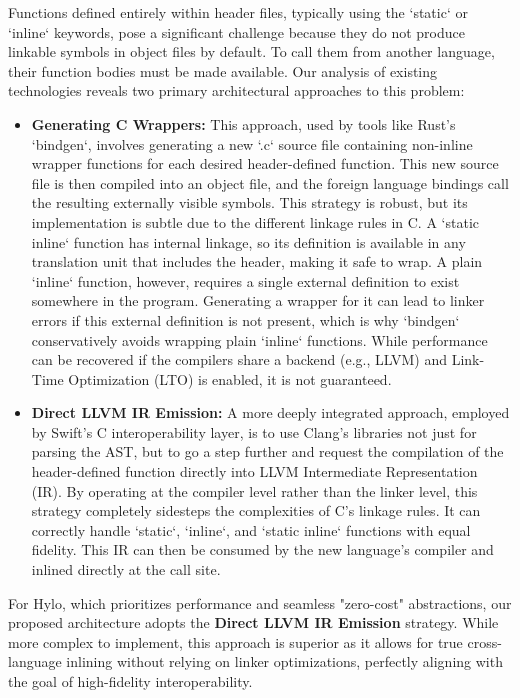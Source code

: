 Functions defined entirely within header files, typically using the `static` or `inline` keywords, pose a significant challenge because they do not produce linkable symbols in object files by default. To call them from another language, their function bodies must be made available. Our analysis of existing technologies reveals two primary architectural approaches to this problem:
\begin{itemize}
    \item \textbf{Generating C Wrappers:} This approach, used by tools like Rust's `bindgen`, involves generating a new `.c` source file containing non-inline wrapper functions for each desired header-defined function. This new source file is then compiled into an object file, and the foreign language bindings call the resulting externally visible symbols. This strategy is robust, but its implementation is subtle due to the different linkage rules in C. A `static inline` function has internal linkage, so its definition is available in any translation unit that includes the header, making it safe to wrap. A plain `inline` function, however, requires a single external definition to exist somewhere in the program. Generating a wrapper for it can lead to linker errors if this external definition is not present, which is why `bindgen` conservatively avoids wrapping plain `inline` functions. While performance can be recovered if the compilers share a backend (e.g., LLVM) and Link-Time Optimization (LTO) is enabled, it is not guaranteed.
    \item \textbf{Direct LLVM IR Emission:} A more deeply integrated approach, employed by Swift's C interoperability layer, is to use Clang's libraries not just for parsing the AST, but to go a step further and request the compilation of the header-defined function directly into LLVM Intermediate Representation (IR). By operating at the compiler level rather than the linker level, this strategy completely sidesteps the complexities of C's linkage rules. It can correctly handle `static`, `inline`, and `static inline` functions with equal fidelity. This IR can then be consumed by the new language's compiler and inlined directly at the call site.
\end{itemize}
For Hylo, which prioritizes performance and seamless "zero-cost" abstractions, our proposed architecture adopts the \textbf{Direct LLVM IR Emission} strategy. While more complex to implement, this approach is superior as it allows for true cross-language inlining without relying on linker optimizations, perfectly aligning with the goal of high-fidelity interoperability.


